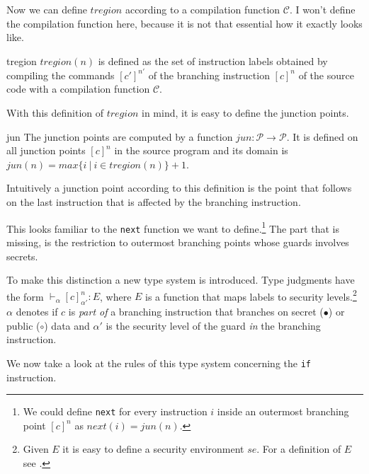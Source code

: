 \documentclass[a4paper,10pt]{llncs}
\begin{document}
Now we can define $tregion$ according to a compilation function $\mathcal{C}$. I won't define
the compilation function here, because it is not that essential how it exactly looks like.

\begin{definition}{tregion}
$tregion(n)$ is defined as the set of instruction labels obtained by compiling the commands
$[c']^{n'}$ of the branching instruction $[c]^n$ of the source code with a compilation function $\mathcal{C}$.
\end{definition}

With this definition of $tregion$ in mind, it is easy to define the junction points.

\begin{definition}{jun}
The junction points are computed by a function $jun: \mathcal{P} \rightarrow \mathcal{P}$. It is defined
on all junction points $[c]^n$ in the source program and its domain is $jun(n) = max \{i\ |\ i \in tregion(n)\} + 1$.
\end{definition}

Intuitively a junction point according to this definition is the point that follows on the last instruction
that is affected by the branching instruction.

This looks familiar to the \texttt{next} function we want to define.\footnote{We could define \texttt{next} for
every instruction $i$ inside an outermost branching point $[c]^n$ as $next(i) = jun(n)$.} The part that is
missing, is the restriction to outermost branching points whose guards involves secrets.

To make this distinction a new type system is introduced. Type judgments have the form
$\vdash_\alpha [c]_{\alpha'}^n : E$, where $E$ is a function that maps labels to security
levels.\footnote{Given $E$ it is easy to define a security environment $se$. For a definition
of $E$ see \cite{Barthe06}.} $\alpha$ denotes if $c$ is \textit{part of} a branching
instruction that branches on secret ($\bullet$) or public ($\circ$) data and $\alpha'$ is the
security level of the guard \textit{in} the branching instruction.

We now take a look at the rules of this type system concerning the \texttt{if} instruction.
\end{document}
